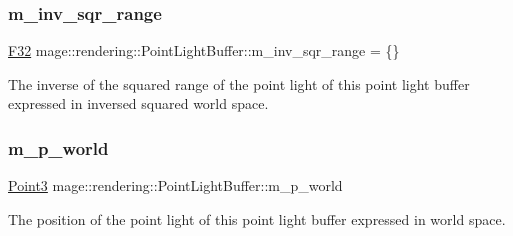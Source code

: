 \subsubsection{\texorpdfstring{m\+\_\+inv\+\_\+sqr\+\_\+range}{m\_inv\_sqr\_range}}
{\footnotesize\ttfamily \mbox{\hyperlink{namespacemage_aa97e833b45f06d60a0a9c4fc22ae02c0}{F32}} mage\+::rendering\+::\+Point\+Light\+Buffer\+::m\+\_\+inv\+\_\+sqr\+\_\+range = \{\}}

The inverse of the squared range of the point light of this point light buffer expressed in inversed squared world space. \mbox{\label{structmage_1_1rendering_1_1_point_light_buffer_abbc64dd98dec18dadc0a3c0003c0e750}} 
\subsubsection{\texorpdfstring{m\+\_\+p\+\_\+world}{m\_p\_world}}
{\footnotesize\ttfamily \mbox{\hyperlink{structmage_1_1_point3}{Point3}} mage\+::rendering\+::\+Point\+Light\+Buffer\+::m\+\_\+p\+\_\+world}

The position of the point light of this point light buffer expressed in world space. 